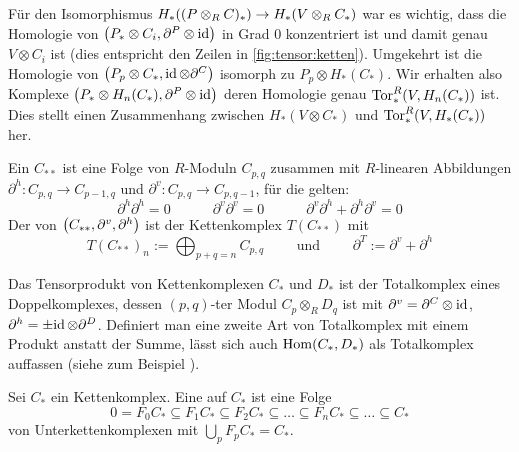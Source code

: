 \begin{bemerkung}[{name=[zu \autoref{lem:projaufl_iso_hom}]}]
	Für den Isomorphismus $H_*\enbrace*{(P \otimes_R C)_*} \to H_*(V \otimes_R C_*)$ war es wichtig, dass die Homologie von $\enbrace*{P_* \otimes C_i,\partial^P \otimes \id}$ in Grad $0$ konzentriert ist und damit genau $V \otimes C_i$ ist (dies entspricht den Zeilen in \cref{fig:tensor:ketten}).
	Umgekehrt ist die Homologie von $\enbrace*{P_p \otimes C_*, \id \otimes \partial^C}$ isomorph zu $P_p \otimes H_*(C_*)$.
	Wir erhalten also Komplexe $\enbrace*{P_* \otimes H_n(C_*), \partial^P \otimes \id}$ deren Homologie genau $\Tor^R_* \enbrace*{V, H_n(C_*)}$ ist.
	Dies stellt einen Zusammenhang zwischen $H_*(V \otimes C_*)$ und $\Tor_*^R \enbrace*{V, H_*(C_*)}$ her.
\end{bemerkung}

\begin{definition}[{name=[Doppelkomplex und Totalkomplex]}]
	Ein  $C_{**}$ ist eine Folge von $R$-Moduln $C_{p,q}$ zusammen mit $R$-linearen Abbildungen $\partial^h \colon C_{p,q} \to C_{p-1,q}$ und $\partial^v \colon C_{p,q} \to C_{p,q-1}$, für die gelten:
	\[
		\partial^h  \partial^h =0 \qquad \quad \partial^v  \partial^v=0 \qquad \quad \partial^v  \partial^h + \partial^h \partial^v =0
	\]
	Der  von $\enbrace*{C_{**}, \partial^v,\partial^h}$ ist der Kettenkomplex $T(C_{**})$ mit 
	\[
		T(C_{**})_n := \bigoplus_{p+q=n} C_{p,q} \qquad \text{ und } \qquad \partial^T := \partial^v + \partial^h
	\]
\end{definition}

\begin{beispiel}[{name=[Tensorprodukt als Totalkomplex]}]
	Das Tensorprodukt von Kettenkomplexen $C_*$ und $D_*$ ist der Totalkomplex eines Doppelkomplexes, dessen $(p,q)$-ter Modul $C_p \otimes_R D_q$ ist mit $\partial^v = \partial^C \otimes \id$, $\partial^h = \pm {\id \otimes \partial^D}$.
	Definiert man eine zweite Art von Totalkomplex mit einem Produkt anstatt der Summe, lässt sich auch $\Hom(C_*,D_*)$ als Totalkomplex auffassen (siehe zum Beispiel \cite[V.1, S.~167ff]{HiltonHomAlg}).
\end{beispiel}

\begin{definition}[{name=[Filtrierung]}]
	Sei $C_*$ ein Kettenkomplex. Eine  auf $C_*$ ist eine Folge 
	\[
		0 = F_0 C_* \subseteq F_1 C_*  \subseteq F_2 C_* \subseteq \ldots \subseteq F_n C_* \subseteq \ldots \subseteq C_*
	\] 
	von  Unterkettenkomplexen mit $\bigcup_{p} F_p C_* = C_*$.
\end{definition}


